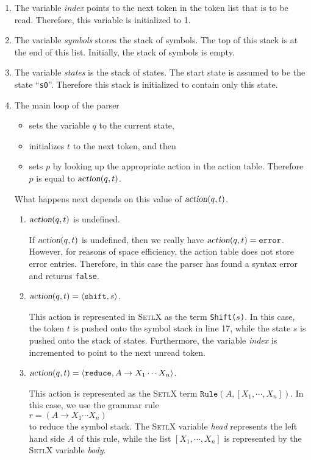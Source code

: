 \begin{enumerate}
\item The variable \textsl{index} points to the next token in the token list that is to be
      read.  Therefore, this variable is initialized to 1.
\item The variable \textsl{symbols} stores the stack of symbols.  The top of this stack is
      at the end of this list.  Initially, the stack of symbols is empty.
\item The variable \textsl{states} is the stack of states.  The start state is assumed to
      be the state ``\texttt{s0}''.  Therefore this stack is initialized to contain
      only this state.
\item The main loop of the parser 
      \begin{itemize}
      \item sets the variable $q$ to the current state,
      \item initializes $t$ to the next token, and then
      \item sets $p$ by looking up the appropriate action in the action table.
            Therefore $p$ is equal to $\textsl{action}(q, t)$.
      \end{itemize}
      What happens next depends on this value of $\textsl{action}(q, t)$.
      \begin{enumerate}
      \item $\textsl{action}(q,t)$ is undefined.

            If $\textsl{action}(q,t)$ is undefined, then we really have $\textsl{action}(q, t) = \mathtt{error}$.
            However, for reasons of space efficiency, the action table does not store
            error entries.  Therefore, in this case the parser has found a syntax error
            and returns \texttt{false}.
      \item $\textsl{action}(q,t) = \pair(\texttt{shift}, s)$.
        
            This action is represented in \textsc{SetlX} as the term \texttt{Shift($s$)}.
            In this case, the token $t$ is pushed onto the symbol stack in line 17,
            while the state $s$ is pushed onto the stack of states.  Furthermore,
            the variable \textsl{index} is incremented to point to the next unread token.            
      \item $\textsl{action}(q,t) = \pair(\texttt{reduce}, A \rightarrow X_1 \cdots X_n)$.

            This action is represented as the \textsc{SetlX} term $\texttt{Rule}(A, [X_1, \cdots,X_n])$.
            In this case, we use the grammar rule
            \\[0.2cm]
            \hspace*{1.3cm}
            $r = (A \rightarrow X_1 \cdots X_n)$
            \\[0.2cm]
            to reduce the symbol stack.  The \textsc{SetlX} variable \textsl{head} represents the left
            hand side $A$ of this rule, while the list $[X_1, \cdots,X_n]$ is represented
            by the \textsc{SetlX} variable \textsl{body}.


\end{enumerate}
\end{enumerate}
